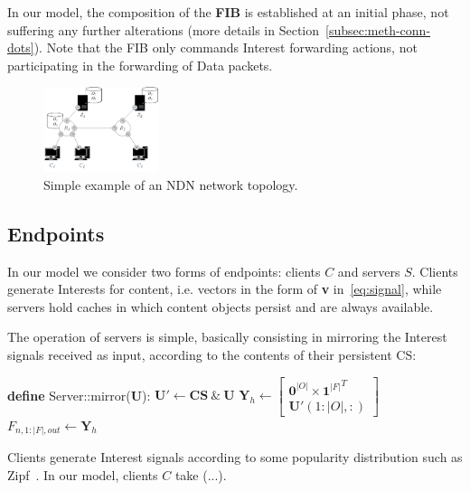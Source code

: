 In our model, the composition of the \textbf{FIB} is established at an initial phase, 
not suffering any further alterations (more details in 
Section~\ref{subsec:meth-conn-dots}). Note 
that the FIB only commands Interest forwarding actions, not participating in the 
forwarding of Data packets.

\begin{figure}[h!]

    \centering
    \includegraphics[width=0.30\textwidth]{figures/fib-topo.png}
    \cprotect\caption{Simple example of an NDN network topology.}
    \label{fig:fib-topo}

\end{figure}

\subsection{Endpoints}
\label{subsec:meth-endpoints}

In our model we consider two forms of endpoints: clients $C$ and servers $S$. 
Clients generate Interests for content, i.e. vectors in the form of \textbf{v} 
in~\ref{eq:signal}, while servers hold caches in which content objects persist 
and are always available.\shortvertbreak

The operation of servers is simple, basically consisting in mirroring the 
Interest signals received as input, according to the contents of their 
persistent CS:\shortvertbreak

\begin{algorithmic}[1]

\State \textbf{define} Server::mirror(\textbf{U}):
\State
    \State $\textbf{U}' \leftarrow \textbf{CS} \ \& \ \textbf{U}$ 
    \State
    \State $\textbf{Y}_h \leftarrow \begin{bmatrix} \textbf{0}^{|O|} \times {\textbf{1}^{|F|}}^{T} \\ \textbf{U}'(1:|O|,:) \end{bmatrix}$ 
    \State
    \State $F_{n,1:|F|,out} \leftarrow \textbf{Y}_h$

\end{algorithmic}\shortvertbreak

Clients generate Interest signals according 
to some popularity distribution such as Zipf~\cite{6038471}. In our model, 
clients $C$ take (...).

